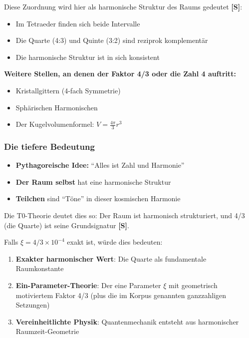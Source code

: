 	Diese Zuordnung wird hier als harmonische Struktur des Raums gedeutet \textbf{[S]}:
	\begin{itemize}
		\item Im Tetraeder finden sich beide Intervalle
		\item Die Quarte (4:3) und Quinte (3:2) sind reziprok komplementär
		\item Die harmonische Struktur ist in sich konsistent
	\end{itemize}
	
	\textbf{Weitere Stellen, an denen der Faktor 4/3 oder die Zahl 4 auftritt:}
	\begin{itemize}
		\item Kristallgittern (4-fach Symmetrie)
		\item Sphärischen Harmonischen
		\item Der Kugelvolumenformel: $V = \frac{4\pi}{3}r^3$
	\end{itemize}
	
	\subsubsection{Die tiefere Bedeutung}
	\label{subsubsec:tiefere_bedeutung}
	
	\begin{tcolorbox}[colback=green!5!white,colframe=green!75!black,title=Die pythagoreische Deutung]
		\begin{itemize}
			\item \textbf{Pythagoreische Idee:} ``Alles ist Zahl und Harmonie''
			\item \textbf{Der Raum selbst} hat eine harmonische Struktur
			\item \textbf{Teilchen} sind ``Töne'' in dieser kosmischen Harmonie
		\end{itemize}
	\end{tcolorbox}
	
	Die T0-Theorie deutet dies so: Der Raum ist harmonisch strukturiert, und 4/3 (die Quarte) ist seine Grundsignatur \textbf{[S]}.
	
	Falls $\xi = 4/3 \times 10^{-4}$ exakt ist, würde dies bedeuten:
	\begin{enumerate}
		\item \textbf{Exakter harmonischer Wert}: Die Quarte als fundamentale Raumkonstante
		\item \textbf{Ein-Parameter-Theorie}: Der eine Parameter $\xi$ mit geometrisch motiviertem Faktor 4/3 (plus die im Korpus genannten ganzzahligen Setzungen)
		\item \textbf{Vereinheitlichte Physik}: Quantenmechanik entsteht aus harmonischer Raumzeit-Geometrie
	\end{enumerate}
	
